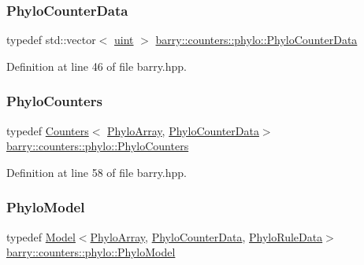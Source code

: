 \subsubsection{\texorpdfstring{Phylo\+Counter\+Data}{PhyloCounterData}}
{\footnotesize\ttfamily typedef std\+::vector$<$ \hyperlink{namespacebarry_a11dfc53ddb4672278319aa04f1e09a6c}{uint} $>$ \hyperlink{namespacebarry_1_1counters_1_1phylo_a6ecc0d8ab76f8dc2db152221a8e9e95a}{barry\+::counters\+::phylo\+::\+Phylo\+Counter\+Data}}



Definition at line 46 of file barry.\+hpp.

\mbox{\label{namespacebarry_1_1counters_1_1phylo_a4e401ffe66d04091343dcffaf915f8c3}} 
\subsubsection{\texorpdfstring{Phylo\+Counters}{PhyloCounters}}
{\footnotesize\ttfamily typedef \hyperlink{classbarry_1_1_counters}{Counters}$<$ \hyperlink{namespacebarry_1_1counters_1_1phylo_abd293bf65e494e903639fb5fb2c91604}{Phylo\+Array}, \hyperlink{namespacebarry_1_1counters_1_1phylo_a6ecc0d8ab76f8dc2db152221a8e9e95a}{Phylo\+Counter\+Data}$>$ \hyperlink{namespacebarry_1_1counters_1_1phylo_a4e401ffe66d04091343dcffaf915f8c3}{barry\+::counters\+::phylo\+::\+Phylo\+Counters}}



Definition at line 58 of file barry.\+hpp.

\mbox{\label{namespacebarry_1_1counters_1_1phylo_ad32b4186e3bab93119df225fddc3c609}} 
\subsubsection{\texorpdfstring{Phylo\+Model}{PhyloModel}}
{\footnotesize\ttfamily typedef \hyperlink{classbarry_1_1_model}{Model}$<$\hyperlink{namespacebarry_1_1counters_1_1phylo_abd293bf65e494e903639fb5fb2c91604}{Phylo\+Array}, \hyperlink{namespacebarry_1_1counters_1_1phylo_a6ecc0d8ab76f8dc2db152221a8e9e95a}{Phylo\+Counter\+Data}, \hyperlink{namespacebarry_1_1counters_1_1phylo_a5da540950bcf3372bcedb17a5b23667c}{Phylo\+Rule\+Data}$>$ \hyperlink{namespacebarry_1_1counters_1_1phylo_ad32b4186e3bab93119df225fddc3c609}{barry\+::counters\+::phylo\+::\+Phylo\+Model}}



